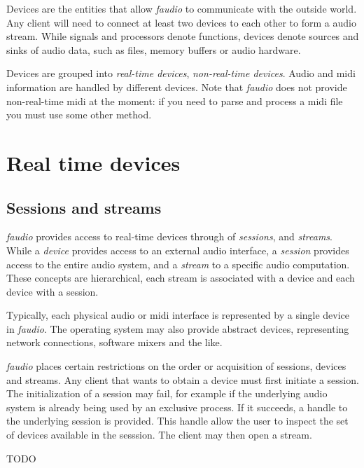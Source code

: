 \label{md__devices_Devices}%
\hypertarget{md__devices_Devices}{}%


Devices are the entities that allow {\itshape faudio} to communicate with the outside world. Any client will need to connect at least two devices to each other to form a audio stream. While signals and processors denote functions, devices denote sources and sinks of audio data, such as files, memory buffers or audio hardware.

Devices are grouped into {\itshape real-\/time devices}, {\itshape non-\/real-\/time devices}. Audio and midi information are handled by different devices. Note that {\itshape faudio} does not provide non-\/real-\/time midi at the moment\-: if you need to parse and process a midi file you must use some other method.\hypertarget{md__devices_RealTime}{}\section{Real time devices}\label{md__devices_RealTime}
\hypertarget{md__devices_SessionsAndStreams}{}\subsection{Sessions and streams}\label{md__devices_SessionsAndStreams}
{\itshape faudio} provides access to real-\/time devices through of {\itshape sessions}, and {\itshape streams}. While a {\itshape device} provides access to an external audio interface, a {\itshape session} provides access to the entire audio system, and a {\itshape stream} to a specific audio computation. These concepts are hierarchical, each stream is associated with a device and each device with a session.

Typically, each physical audio or midi interface is represented by a single device in {\itshape faudio}. The operating system may also provide abstract devices, representing network connections, software mixers and the like.

{\itshape faudio} places certain restrictions on the order or acquisition of sessions, devices and streams. Any client that wants to obtain a device must first initiate a session. The initialization of a session may fail, for example if the underlying audio system is already being used by an exclusive process. If it succeeds, a handle to the underlying session is provided. This handle allow the user to inspect the set of devices available in the sesssion. The client may then open a stream.

T\-O\-D\-O


